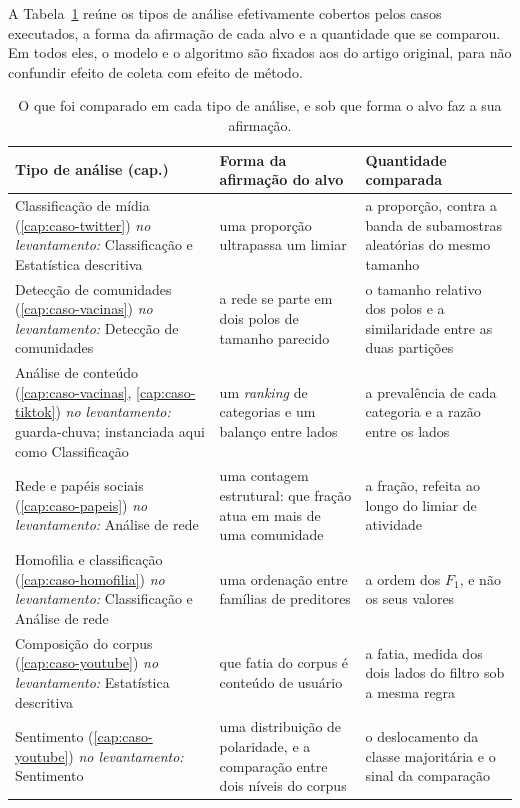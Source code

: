 A Tabela~\ref{tab:metricas} reúne os tipos de análise efetivamente cobertos pelos
casos executados, a forma da afirmação de cada alvo e a quantidade que se comparou.
Em todos eles, o modelo e o algoritmo são fixados aos do artigo original, para não
confundir efeito de coleta com efeito de método.

\begin{table}[htbp]
\centering\footnotesize
\caption[O que foi comparado em cada tipo de análise]{O que foi comparado em cada tipo de análise, e sob que forma o alvo faz
a sua afirmação.}
\label{tab:metricas}
\begin{tabularx}{\textwidth}{@{}>{\raggedright\arraybackslash}p{3.5cm}>{\raggedright\arraybackslash}p{4.1cm}X@{}}
\toprule
Tipo de análise (cap.) & Forma da afirmação do alvo & Quantidade comparada \\
\midrule
Classificação de mídia (\ref{cap:caso-twitter})
  \newline \textit{no levantamento:} Classificação e Estatística descritiva
  & uma proporção ultrapassa um limiar & a proporção, contra a banda de subamostras aleatórias do mesmo tamanho \\
\addlinespace[2pt]
Detecção de comunidades (\ref{cap:caso-vacinas})
  \newline \textit{no levantamento:} Detecção de comunidades
  & a rede se parte em dois polos de tamanho parecido & o tamanho relativo dos polos e a similaridade entre as duas partições \\
\addlinespace[2pt]
Análise de conteúdo (\ref{cap:caso-vacinas}, \ref{cap:caso-tiktok})
  \newline \textit{no levantamento:} guarda-chuva; instanciada aqui como Classificação
  & um \emph{ranking} de categorias e um balanço entre lados & a prevalência de cada categoria e a razão entre os lados \\
\addlinespace[2pt]
Rede e papéis sociais (\ref{cap:caso-papeis})
  \newline \textit{no levantamento:} Análise de rede
  & uma contagem estrutural: que fração atua em mais de uma comunidade & a fração, refeita ao longo do limiar de atividade \\
\addlinespace[2pt]
Homofilia e classificação (\ref{cap:caso-homofilia})
  \newline \textit{no levantamento:} Classificação e Análise de rede
  & uma ordenação entre famílias de preditores & a ordem dos $F_1$, e não os seus valores \\
\addlinespace[2pt]
Composição do corpus (\ref{cap:caso-youtube})
  \newline \textit{no levantamento:} Estatística descritiva
  & que fatia do corpus é conteúdo de usuário & a fatia, medida dos dois lados do filtro sob a mesma regra \\
\addlinespace[2pt]
Sentimento (\ref{cap:caso-youtube})
  \newline \textit{no levantamento:} Sentimento
  & uma distribuição de polaridade, e a comparação entre dois níveis do corpus & o deslocamento da classe majoritária e o sinal da comparação \\
\bottomrule
\end{tabularx}


\end{table}
